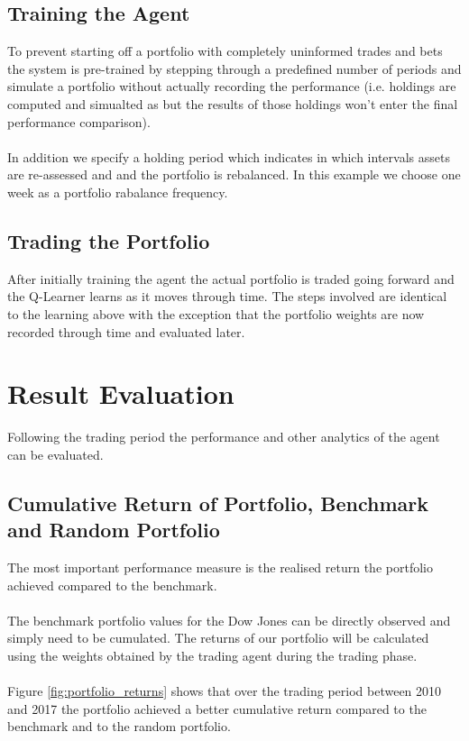 \documentclass[dvips,12pt]{article}
\begin{document}
\subsection{Training the Agent}
To prevent starting off a portfolio with completely uninformed trades and bets the system is pre-trained by stepping through a predefined number of periods and simulate a portfolio without actually recording the performance (i.e. holdings are computed and simualted as but the results of those holdings won't enter the final performance comparison).
\\\\
In addition we specify a holding period which indicates in which intervals assets are re-assessed and and the portfolio is rebalanced. In this example we choose one week as a portfolio rabalance frequency.

\subsection{Trading the Portfolio}
After initially training the agent the actual portfolio is traded going forward and the Q-Learner learns as it moves through time. The steps involved are identical to the learning above with the exception that the portfolio weights are now recorded through time and evaluated later.

\section{Result Evaluation}
Following the trading period the performance and other analytics of the agent can be evaluated.

\subsection{Cumulative Return of Portfolio, Benchmark and Random Portfolio}
The most important performance measure is the realised return the portfolio achieved compared to the benchmark.
\\\\
The benchmark portfolio values for the Dow Jones can be directly observed and simply need to be cumulated. The returns of our portfolio will be calculated using the weights obtained by the trading agent during the trading phase.
\\\\
Figure \ref{fig:portfolio_returns} shows that over the trading period between 2010 and 2017 the portfolio achieved a better cumulative return compared to the benchmark and to the random portfolio.
\end{document}
